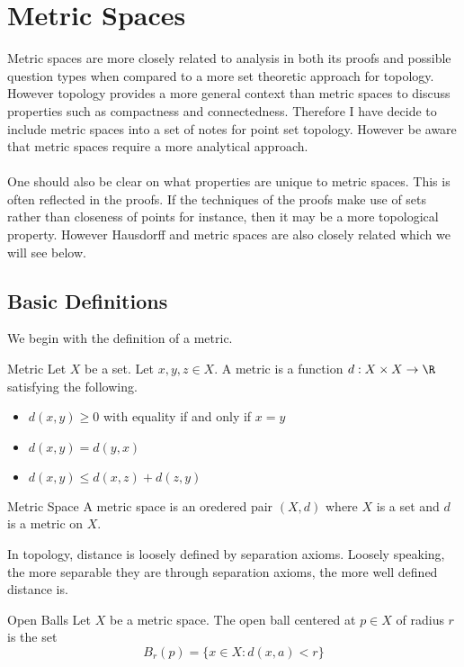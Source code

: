\section{Metric Spaces}
Metric spaces are more closely related to analysis in both its proofs and possible question types when compared to a more set theoretic approach for topology. However topology provides a more general context than metric spaces to discuss properties such as compactness and connectedness. Therefore I have decide to include metric spaces into a set of notes for point set topology. However be aware that metric spaces require a more analytical approach. \\~\\
One should also be clear on what properties are unique to metric spaces. This is often reflected in the proofs. If the techniques of the proofs make use of sets rather than closeness of points for instance, then it may be a more topological property. However Hausdorff and metric spaces are also closely related which we will see below. 
\subsection{Basic Definitions}
We begin with the definition of a metric. 
\begin{defn}{Metric}{} Let $X$ be a set. Let $x,y,z\in X$. A metric is a function $d:X\times X\to\R$ satisfying the following. 
\begin{itemize}
\item $d(x,y)\geq 0$ with equality if and only if $x=y$
\item $d(x,y)=d(y,x)$
\item $d(x,y)\leq d(x,z)+d(z,y)$
\end{itemize}
\end{defn}

\begin{defn}{Metric Space}{} A metric space is an oredered pair $(X,d)$ where $X$ is a set and $d$ is a metric on $X$. 
\end{defn}

In topology, distance is loosely defined by separation axioms. Loosely speaking, the more separable they are through separation axioms, the more well defined distance is. 

\begin{defn}{Open Balls}{} Let $X$ be a metric space. The open ball centered at $p\in X$ of radius $r$ is the set $$B_r(p)=\{x\in X:d(x,a)<r\}$$
\end{defn}

